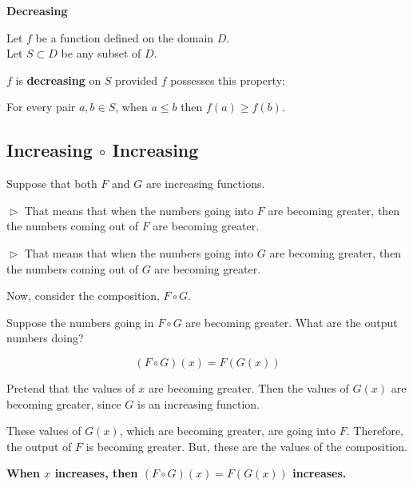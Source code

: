 \documentclass{ximera}
\begin{document}
\begin{summary} \textbf{\textcolor{green!50!black}{Decreasing}} 


Let $f$ be a function defined on the domain $D$. \\
Let $S \subset D$ be any subset of $D$.

$f$ is \textbf{decreasing} on $S$ provided $f$ possesses this property:  


\begin{center}
For every pair $a, b \in S$, when $a \leq b$ then $f(a) \geq f(b)$.
\end{center}

\end{summary}











\subsection*{Increasing $\circ$ Increasing}


Suppose that both $F$ and $G$ are increasing functions. 

$\vartriangleright$ That means that when the numbers going into $F$ are becoming greater, then the numbers coming out of $F$ are becoming greater. 

$\vartriangleright$ That means that when the numbers going into $G$ are becoming greater, then the numbers coming out of $G$ are becoming greater. 



Now, consider the composition, $F \circ G$. 


Suppose the numbers going in $F \circ G$ are becoming greater.  What are the output numbers doing? 




\[ (F \circ G)(x) = F(G(x)) \]


Pretend that the values of $x$ are becoming greater. Then the values of $G(x)$ are becoming greater, since $G$ is an increasing function.

These values of $G(x)$, which are becoming greater, are going into $F$.  Therefore, the output of $F$ is becoming greater.  But, these are the values of the composition.



\begin{center}
\textbf{\textcolor{red!70!black}{When $x$ increases, then $(F \circ G)(x) = F(G(x))$ increases.}}
\end{center}
\end{document}
